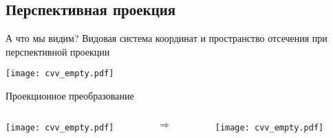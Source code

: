 \documentclass[10pt]{beamer}
\begin{document}
	
	\subsection{Перспективная проекция}
	
	\begin{frame}{А что мы видим?}
		\centering
		Видовая система координат и пространство отсечения при перспективной проекции
		
		\texttt{[image: cvv\_empty.pdf]}
		
	\end{frame}
	
	
	\begin{frame}{Проекционное преобразование}
		
		\centering
		\begin{columns}
			\begin{column}{0.5\textwidth}
				\texttt{[image: cvv\_empty.pdf]}
			\end{column}
			
			\begin{column}{0.1\textwidth}
				$\Rightarrow$
			\end{column}
			
			
			\begin{column}{0.4\textwidth}
				\texttt{[image: cvv\_empty.pdf]}
			\end{column}
		\end{columns}
		
		
		
		
	\end{frame}
	
\end{document}
